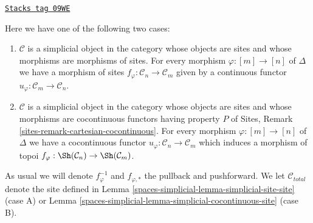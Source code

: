 \begin{definition}
\label{spaces-simplicial-situation-simplicial-site}
\href{https://stacks.math.columbia.edu/tag/09WE}{\texttt{Stacks tag 09WE}}

Here we have one of the following two cases:
\begin{enumerate}
\item[(A)] $\mathcal{C}$ is a simplicial object in the category whose
objects are sites and whose morphisms are morphisms of sites. For every
morphism $\varphi : [m] \to [n]$ of $\Delta$ we have a morphism of sites
$f_\varphi : \mathcal{C}_n \to \mathcal{C}_m$ given by a continuous
functor $u_\varphi : \mathcal{C}_m \to \mathcal{C}_n$.
\item[(B)] $\mathcal{C}$ is a simplicial object in the category whose
objects are sites and whose morphisms are cocontinuous functors having
property $P$ of Sites, Remark \ref{sites-remark-cartesian-cocontinuous}.
For every morphism $\varphi : [m] \to [n]$ of $\Delta$ we have a cocontinuous
functor $u_\varphi : \mathcal{C}_n \to \mathcal{C}_m$ which induces a
morphism of topoi $f_\varphi : \Sh(\mathcal{C}_n) \to \Sh(\mathcal{C}_m)$.
\end{enumerate}
As usual we will denote $f_\varphi^{-1}$ and $f_{\varphi, *}$ the
pullback and pushforward. We let $\mathcal{C}_{total}$ denote the
site defined in
Lemma \ref{spaces-simplicial-lemma-simplicial-site-site} (case A) or
Lemma \ref{spaces-simplicial-lemma-simplicial-cocontinuous-site} (case B).
\end{definition}

